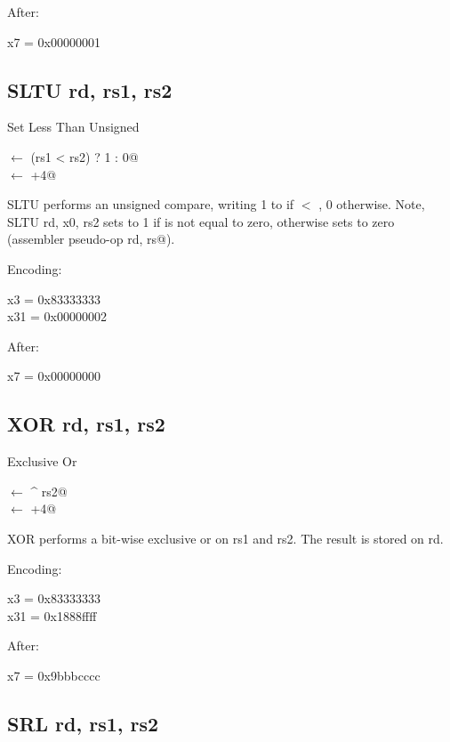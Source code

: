 After:

x7 = 0x00000001

\subsection{SLTU rd, rs1, rs2}

Set Less Than Unsigned 

\verb@rd@ $\leftarrow$ \verb@(rs1 < rs2) ? 1 : 0@\\
\verb@pc@ $\leftarrow$ \verb@pc+4@

SLTU performs an unsigned compare, writing 1 to  if  $<$ , 0 otherwise. 
Note, SLTU rd, x0, rs2 sets  to 1 if  is not equal to zero, otherwise 
sets  to zero (assembler pseudo-op \verb@SNEZ rd, rs@).~\cite[p.~15]{rvismv1v22:2017}

Encoding:


x3  = 0x83333333\\
x31 = 0x00000002

After:

x7 = 0x00000000

\subsection{XOR rd, rs1, rs2}

Exclusive Or

\verb@rd@ $\leftarrow$  ^ rs2@\\
\verb@pc@ $\leftarrow$ \verb@pc+4@

XOR performs a bit-wise exclusive or on rs1 and rs2.  
The result is stored on rd.

Encoding:


x3  = 0x83333333\\
x31 = 0x1888ffff

After:

x7 = 0x9bbbcccc

\subsection{SRL rd, rs1, rs2}

